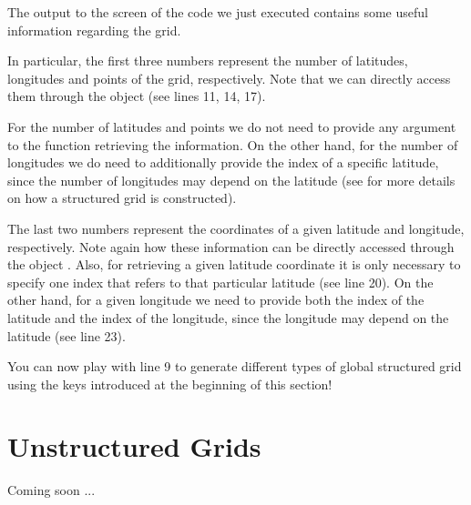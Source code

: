 The output to the screen of the code we just executed 
contains some useful information regarding the grid.

In particular, the first three numbers represent the 
number of latitudes, longitudes and points of the grid,
respectively. Note that we can directly access them 
through the  object (see lines 11, 14, 17).
%
\begin{tipbox}
For the number of latitudes and points we do not need to provide
any argument to the function retrieving the information. On the 
other hand, for the number of longitudes we do need to additionally 
provide the index of a specific latitude, since the number of 
longitudes may depend on the latitude (see  
for more details on how a structured grid is constructed). 
\end{tipbox}
%
The last two numbers represent the coordinates of a given 
latitude and longitude, respectively. Note again how these 
information can be directly accessed through the object 
. 
Also, for retrieving a given latitude coordinate it is only 
necessary to specify one index that refers to that particular 
latitude (see line 20). On the other hand, for a given longitude 
we need to provide both the index of the latitude and the index 
of the longitude, since the longitude may depend on the latitude 
(see line 23).

You can now play with line 9 to generate 
different types of global structured grid using the keys introduced 
at the beginning of this section!



\section{Unstructured Grids}
Coming soon ...
